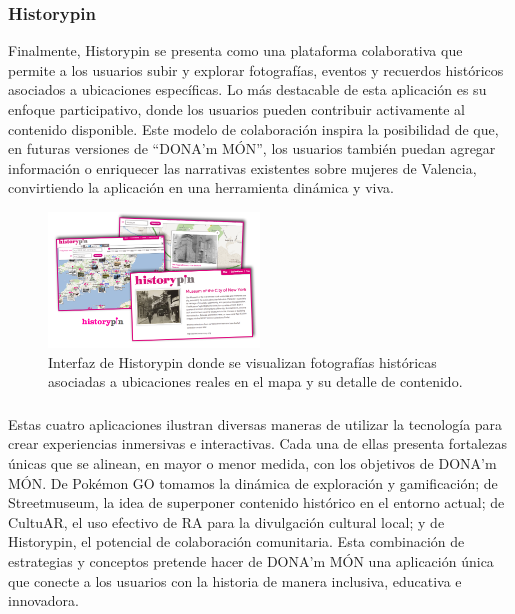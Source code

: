 \subsubsection{Historypin}

Finalmente, Historypin se presenta como una plataforma colaborativa que permite a los usuarios subir y explorar fotografías, eventos y recuerdos históricos asociados a ubicaciones específicas. Lo más destacable de esta aplicación es su enfoque participativo, donde los usuarios pueden contribuir activamente al contenido disponible. Este modelo de colaboración inspira la posibilidad de que, en futuras versiones de “DONA’m MÓN”, los usuarios también puedan agregar información o enriquecer las narrativas existentes sobre mujeres de Valencia, convirtiendo la aplicación en una herramienta dinámica y viva.

\begin{figure}[H]
    \centering
    \includegraphics[width=0.5\textwidth]{figs/history-pin.png}
    \caption{Interfaz de Historypin donde se visualizan fotografías históricas asociadas a ubicaciones reales en el mapa y su detalle de contenido.}
    \label{fig:historypin}
\end{figure}
\subsubsection{}

Estas cuatro aplicaciones ilustran diversas maneras de utilizar la tecnología para crear experiencias inmersivas e interactivas. Cada una de ellas presenta fortalezas únicas que se alinean, en mayor o menor medida, con los objetivos de DONA'm MÓN. De Pokémon GO tomamos la dinámica de exploración y gamificación; de Streetmuseum, la idea de superponer contenido histórico en el entorno actual; de CultuAR, el uso efectivo de RA para la divulgación cultural local; y de Historypin, el potencial de colaboración comunitaria. Esta combinación de estrategias y conceptos pretende hacer de DONA'm MÓN una aplicación única que conecte a los usuarios con la historia de manera inclusiva, educativa e innovadora.



